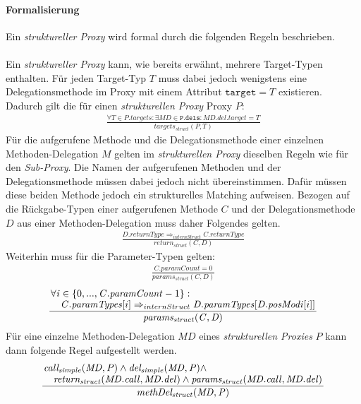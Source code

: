 \paragraph{Formalisierung}
Ein \emph{struktureller Proxy} wird formal durch die folgenden Regeln beschrieben.
\\\\
Ein \emph{struktureller Proxy} kann, wie bereits erwähnt, mehrere Target-Typen enthalten.
Für jeden Target-Typ $T$ muss dabei jedoch wenigstens eine Delegationsmethode im Proxy mit einem Attribut $\texttt{target} = T$ existieren. Dadurch gilt die für einen \emph{strukturellen Proxy} Proxy $P$:
\begin{gather*}
\frac{\forall \mathit{T} \in \mathit{P.targets}:\exists \mathit{MD} \in \mathtt{P.dels}:\mathit{MD.del.target} = T}{\mathit{targets_{struct}(P, T)}}
\end{gather*}
Für die aufgerufene Methode und die Delegationsmethode einer einzelnen Methoden-Delegation $\mathit{M}$ gelten im \emph{strukturellen Proxy} dieselben Regeln wie für den \emph{Sub-Proxy}. Die Namen der aufgerufenen Methoden und der Delegationsmethode müssen dabei jedoch nicht übereinstimmen. Dafür müssen diese beiden Methode jedoch ein strukturelles Matching aufweisen. Bezogen auf die Rückgabe-Typen einer aufgerufenen Methode $\mathit{C}$ und der Delegationsmethode $\mathit{D}$ aus einer Methoden-Delegation muss daher Folgendes gelten.
\begin{gather*}
\frac{\mathit{D.returnType} \Rightarrow_{internStruct} \mathit{C.returnType}}{\mathit{return_{struct}(C,D)}}
\end{gather*} 
Weiterhin muss für die Parameter-Typen gelten:
\begin{gather*}
\frac{\mathit{C.paramCount} = 0}{\mathit{params_{struct}(C,D)}}
\end{gather*} 
\begin{gather*}
\frac{\splitfrac{\forall \mathit{i} \in \{0,...,\mathit{C.paramCount}-1\}:}
{ \mathit{C.paramTypes}[i] \Rightarrow_{internStruct} \mathit{D.paramTypes}[\mathit{D.posModi}[i]]
}}{\mathit{params_{struct}(C,D)}}
\end{gather*} 
Für eine einzelne Methoden-Delegation $\mathit{MD}$ eines \emph{strukturellen Proxies} $P$ kann dann folgende Regel aufgestellt werden.
\begin{gather*}
\frac{\splitfrac{\mathit{call_{simple}(MD,P)} \wedge \mathit{del_{simple}(MD,P)} \wedge} {\mathit{return_{struct}(MD.call, MD.del)} \wedge \mathit{params_{struct}(MD.call, MD.del)}}
}
{\mathit{methDel_{struct}(MD,P)}}
\end{gather*}
